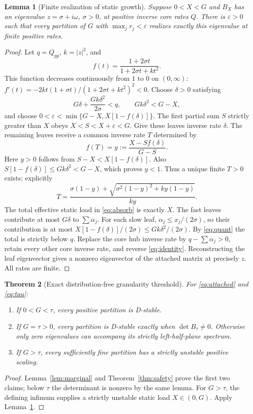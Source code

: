 \documentclass[11pt]{article}
\newtheorem{theorem}{Theorem}[section]
\newtheorem{lemma}[theorem]{Lemma}
\theoremstyle{remark}\newtheorem{remark}[theorem]{Remark}
\begin{document}
\begin{lemma}[Finite realization of static growth]\label{lem:finite}
Suppose $0<X<G$ and $B_X$ has an eigenvalue $z=\sigma+i\omega$, $\sigma>0$,
at positive inverse core rates $Q$. There is $\varepsilon>0$ such that
every partition of $G$ with $\max_jr_j<\varepsilon$ realizes exactly this
eigenvalue at finite positive rates.
\end{lemma}
\begin{proof}
Let $q=Q_{pp}$, $k=|z|^2$, and
\[
 f(t)=\frac{1+2\sigma t}{1+2\sigma t+kt^2}.
\]
This function decreases continuously from $1$ to $0$ on $(0,\infty)$:
$f'(t)=-2kt(1+\sigma t)/(1+2\sigma t+kt^2)^2<0$.
Choose $\delta>0$ satisfying
\begin{equation}\label{eq:quant}
 G\delta+\frac{Gk\delta^2}{2\sigma}<q,\qquad
 Gk\delta^2<G-X,
\end{equation}
and choose
$0<\varepsilon<\min\{G-X,X[1-f(\delta)]\}$.
The first partial sum $S$ strictly greater than $X$ obeys
$X<S<X+\varepsilon<G$. Give these leaves inverse rate $\delta$.
The remaining leaves receive a common inverse rate $T$ determined by
\begin{equation}\label{eq:T}
 f(T)=y:=\frac{X-Sf(\delta)}{G-S}.
\end{equation}
Here $y>0$ follows from $S-X<X[1-f(\delta)]$.
Also $S[1-f(\delta)]\le Gk\delta^2<G-X$, which proves $y<1$.
Thus a unique finite $T>0$ exists; explicitly
\[
 T=\frac{\sigma(1-y)+\sqrt{\sigma^2(1-y)^2+ky(1-y)}}{ky}.
\]
The total effective static load in \eqref{eq:absorb} is exactly $X$.
The fast leaves contribute at most $G\delta$ to $\sum\alpha_j$.
For each slow leaf, $\alpha_j\le x_j/(2\sigma)$, so their contribution
is at most $X[1-f(\delta)]/(2\sigma)\le Gk\delta^2/(2\sigma)$.
By \eqref{eq:quant} the total is strictly below $q$.
Replace the core hub inverse rate by $q-\sum\alpha_j>0$, retain every
other core inverse rate, and reverse \eqref{eq:identity}. Reconstructing
the leaf eigenvector gives a nonzero eigenvector of the attached matrix
at precisely $z$. All rates are finite.
\end{proof}

\begin{theorem}[Exact distribution-free granularity threshold]\label{thm:threshold}
For \eqref{eq:attached} and \eqref{eq:tau}:
\begin{enumerate}
\item If $0<G<\tau$, every positive partition is D-stable.
\item If $G=\tau>0$, every partition is D-stable exactly when
$\det B_\tau\ne0$. Otherwise only zero eigenvalues can accompany its
strictly left-half-plane spectrum.
\item If $G>\tau$, every sufficiently fine partition has a strictly
unstable positive scaling.
\end{enumerate}
\end{theorem}
\begin{proof}
Lemma~\ref{lem:marginal} and Theorem~\ref{thm:safety} prove the first two
claims; below $\tau$ the determinant is nonzero by the same lemma.
For $G>\tau$, the defining infimum supplies a strictly unstable static
load $X\in(0,G)$. Apply Lemma~\ref{lem:finite}.
\end{proof}
\end{document}
